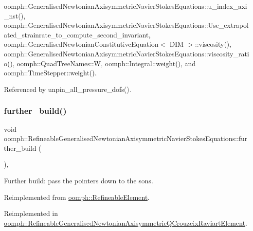 oomph\+::\+Generalised\+Newtonian\+Axisymmetric\+Navier\+Stokes\+Equations\+::u\+\_\+index\+\_\+axi\+\_\+nst(), oomph\+::\+Generalised\+Newtonian\+Axisymmetric\+Navier\+Stokes\+Equations\+::\+Use\+\_\+extrapolated\+\_\+strainrate\+\_\+to\+\_\+compute\+\_\+second\+\_\+invariant, oomph\+::\+Generalised\+Newtonian\+Constitutive\+Equation$<$ D\+I\+M $>$\+::viscosity(), oomph\+::\+Generalised\+Newtonian\+Axisymmetric\+Navier\+Stokes\+Equations\+::viscosity\+\_\+ratio(), oomph\+::\+Quad\+Tree\+Names\+::W, oomph\+::\+Integral\+::weight(), and oomph\+::\+Time\+Stepper\+::weight().



Referenced by unpin\+\_\+all\+\_\+pressure\+\_\+dofs().

\mbox{\label{classoomph_1_1RefineableGeneralisedNewtonianAxisymmetricNavierStokesEquations_af800c46aa82a7188565d68df5aee6fa0}} 
\subsubsection{\texorpdfstring{further\+\_\+build()}{further\_build()}}
{\footnotesize\ttfamily void oomph\+::\+Refineable\+Generalised\+Newtonian\+Axisymmetric\+Navier\+Stokes\+Equations\+::further\+\_\+build (\begin{DoxyParamCaption}{ }\end{DoxyParamCaption})\hspace{0.3cm}{\ttfamily [inline]}, {\ttfamily [virtual]}}



Further build\+: pass the pointers down to the sons. 



Reimplemented from \hyperlink{classoomph_1_1RefineableElement_a26628ce36dfad028686adeb4694a9ef3}{oomph\+::\+Refineable\+Element}.



Reimplemented in \hyperlink{classoomph_1_1RefineableGeneralisedNewtonianAxisymmetricQCrouzeixRaviartElement_a56b98748492bec100b08532892d5ac7f}{oomph\+::\+Refineable\+Generalised\+Newtonian\+Axisymmetric\+Q\+Crouzeix\+Raviart\+Element}.



